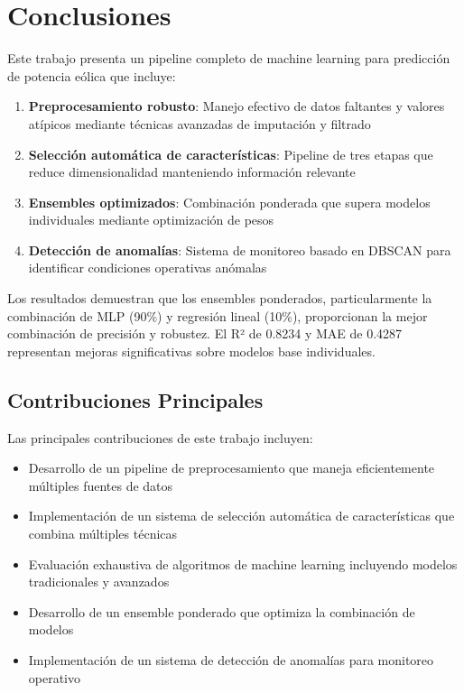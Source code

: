 \documentclass[conference]{IEEEtran}
\begin{document}
	\section{Conclusiones}
	
	Este trabajo presenta un pipeline completo de machine learning para predicción de potencia eólica que incluye:
	
	\begin{enumerate}
		\item \textbf{Preprocesamiento robusto}: Manejo efectivo de datos faltantes y valores atípicos mediante técnicas avanzadas de imputación y filtrado
		\item \textbf{Selección automática de características}: Pipeline de tres etapas que reduce dimensionalidad manteniendo información relevante
		\item \textbf{Ensembles optimizados}: Combinación ponderada que supera modelos individuales mediante optimización de pesos
		\item \textbf{Detección de anomalías}: Sistema de monitoreo basado en DBSCAN para identificar condiciones operativas anómalas
	\end{enumerate}
	
	Los resultados demuestran que los ensembles ponderados, particularmente la combinación de MLP (90\%) y regresión lineal (10\%), proporcionan la mejor combinación de precisión y robustez. El R² de 0.8234 y MAE de 0.4287 representan mejoras significativas sobre modelos base individuales.
	
	\subsection{Contribuciones Principales}
	Las principales contribuciones de este trabajo incluyen:
	\begin{itemize}
		\item Desarrollo de un pipeline de preprocesamiento que maneja eficientemente múltiples fuentes de datos
		\item Implementación de un sistema de selección automática de características que combina múltiples técnicas
		\item Evaluación exhaustiva de algoritmos de machine learning incluyendo modelos tradicionales y avanzados
		\item Desarrollo de un ensemble ponderado que optimiza la combinación de modelos
		\item Implementación de un sistema de detección de anomalías para monitoreo operativo
	\end{itemize}
	
\end{document}
